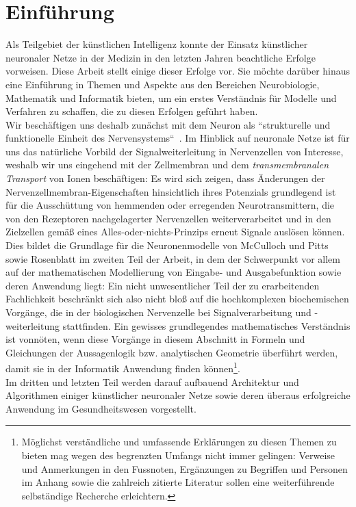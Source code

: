\chapter{Einführung}

Als Teilgebiet der künstlichen Intelligenz konnte der Einsatz künstlicher neuronaler Netze in der Medizin in den letzten Jahren beachtliche Erfolge vorweisen.
Diese Arbeit stellt einige dieser Erfolge vor.
Sie möchte darüber hinaus eine Einführung in Themen und Aspekte aus den Bereichen Neurobiologie, Mathematik und Informatik bieten, um ein erstes Verständnis für Modelle und Verfahren zu schaffen, die zu diesen Erfolgen geführt haben.\\

Wir beschäftigen uns deshalb zunächst mit dem Neuron als ``strukturelle und funktionelle Einheit des Nervensystems``~\cite[42]{SD07}.
Im Hinblick auf neuronale Netze ist für uns das natürliche Vorbild der Signalweiterleitung in Nervenzellen von Interesse, weshalb wir uns eingehend mit der Zellmembran und dem \textit{transmembranalen Transport} von Ionen beschäftigen: Es wird sich zeigen, dass Änderungen der Nervenzellmembran-Eigenschaften hinsichtlich ihres Potenzials grundlegend ist für die Ausschüttung von hemmenden oder erregenden Neurotransmittern, die von den Rezeptoren nachgelagerter Nervenzellen weiterverarbeitet und in den Zielzellen gemäß eines Alles-oder-nichts-Prinzips erneut Signale auslösen können.\\

Dies bildet die Grundlage für die Neuronenmodelle von McCulloch und Pitts sowie Rosenblatt im zweiten Teil der Arbeit, in dem der Schwerpunkt vor allem auf der mathematischen Modellierung von Eingabe- und Ausgabefunktion sowie deren Anwendung liegt: Ein nicht unwesentlicher Teil der zu erarbeitenden Fachlichkeit beschränkt sich also nicht bloß auf die hochkomplexen biochemischen Vorgänge, die in der biologischen Nervenzelle bei Signalverarbeitung und -weiterleitung stattfinden.
Ein gewisses grundlegendes mathematisches Verständnis ist vonnöten, wenn diese Vorgänge in diesem Abschnitt in Formeln und Gleichungen der Aussagenlogik {bzw.} analytischen Geometrie überführt werden, damit sie in der Informatik Anwendung finden können\footnote{
    Möglichst verständliche und umfassende Erklärungen zu diesen Themen zu bieten mag wegen des begrenzten Umfangs nicht immer gelingen: Verweise und Anmerkungen in den Fussnoten, Ergänzungen zu Begriffen und Personen im Anhang sowie die zahlreich zitierte Literatur sollen eine weiterführende selbständige Recherche erleichtern.
}.\\

Im dritten und letzten Teil werden darauf aufbauend Architektur und Algorithmen einiger künstlicher neuronaler Netze sowie deren überaus erfolgreiche Anwendung im Gesundheitswesen vorgestellt.
